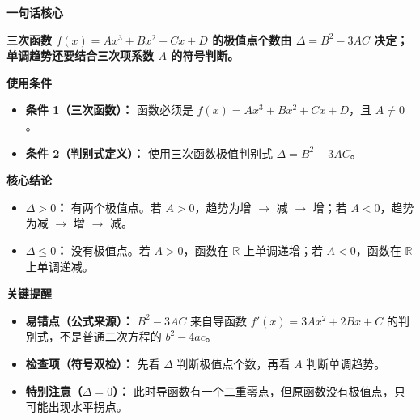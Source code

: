 \begin{summarybox}
	\textbf{\textcolor{CSummary}{一句话核心}}

	\textbf{三次函数 $f(x)=Ax^3+Bx^2+Cx+D$ 的极值点个数由 $\Delta=B^2-3AC$ 决定；单调趋势还要结合三次项系数 $A$ 的符号判断。}

	\medskip
	\textbf{\textcolor{CSummary}{使用条件}}
	\begin{itemize}[leftmargin=*, itemsep=0.5em, topsep=0.4em]
		\item \textbf{条件 1（三次函数）：} 函数必须是 $f(x)=Ax^3+Bx^2+Cx+D$，且 $A\neq0$。
		\item \textbf{条件 2（判别式定义）：} 使用三次函数极值判别式 $\Delta=B^2-3AC$。
	\end{itemize}

	\medskip
	\textbf{\textcolor{CSummary}{核心结论}}
	\begin{itemize}[leftmargin=*, itemsep=0.5em, topsep=0.4em]
		\item \textbf{$\Delta>0$：} 有两个极值点。若 $A>0$，趋势为增 $\rightarrow$ 减 $\rightarrow$ 增；若 $A<0$，趋势为减 $\rightarrow$ 增 $\rightarrow$ 减。
		\item \textbf{$\Delta\le0$：} 没有极值点。若 $A>0$，函数在 $\mathbb{R}$ 上单调递增；若 $A<0$，函数在 $\mathbb{R}$ 上单调递减。
	\end{itemize}

	\medskip
	\textbf{\textcolor{CSummary}{关键提醒}}
	\begin{itemize}[leftmargin=*, itemsep=0.5em, topsep=0.4em]
		\item \textbf{易错点（公式来源）：} $B^2-3AC$ 来自导函数 $f'(x)=3Ax^2+2Bx+C$ 的判别式，不是普通二次方程的 $b^2-4ac$。
		\item \textbf{检查项（符号双检）：} 先看 $\Delta$ 判断极值点个数，再看 $A$ 判断单调趋势。
		\item \textbf{特别注意（$\Delta=0$）：} 此时导函数有一个二重零点，但原函数没有极值点，只可能出现水平拐点。
	\end{itemize}
\end{summarybox}